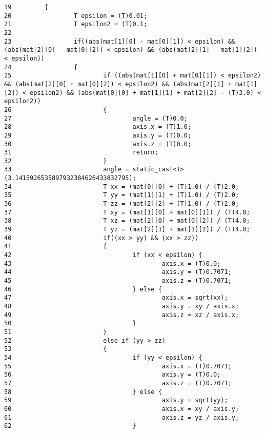 \begin{Code}\begin{verbatim}19         {
20                 T epsilon = (T)0.01;
21                 T epsilon2 = (T)0.1;
22 
23                 if((abs(mat[1][0] - mat[0][1]) < epsilon) && (abs(mat[2][0] - mat[0][2]) < epsilon) && (abs(mat[2][1] - mat[1][2]) < epsilon))
24                 {
25                         if ((abs(mat[1][0] + mat[0][1]) < epsilon2) && (abs(mat[2][0] + mat[0][2]) < epsilon2) && (abs(mat[2][1] + mat[1][2]) < epsilon2) && (abs(mat[0][0] + mat[1][1] + mat[2][2] - (T)3.0) < epsilon2))
26                         {
27                                 angle = (T)0.0;
28                                 axis.x = (T)1.0;
29                                 axis.y = (T)0.0;
30                                 axis.z = (T)0.0;
31                                 return;
32                         }
33                         angle = static_cast<T>(3.1415926535897932384626433832795);
34                         T xx = (mat[0][0] + (T)1.0) / (T)2.0;
35                         T yy = (mat[1][1] + (T)1.0) / (T)2.0;
36                         T zz = (mat[2][2] + (T)1.0) / (T)2.0;
37                         T xy = (mat[1][0] + mat[0][1]) / (T)4.0;
38                         T xz = (mat[2][0] + mat[0][2]) / (T)4.0;
39                         T yz = (mat[2][1] + mat[1][2]) / (T)4.0;
40                         if((xx > yy) && (xx > zz))
41                         {
42                                 if (xx < epsilon) {
43                                         axis.x = (T)0.0;
44                                         axis.y = (T)0.7071;
45                                         axis.z = (T)0.7071;
46                                 } else {
47                                         axis.x = sqrt(xx);
48                                         axis.y = xy / axis.x;
49                                         axis.z = xz / axis.x;
50                                 }
51                         }
52                         else if (yy > zz)
53                         {
54                                 if (yy < epsilon) {
55                                         axis.x = (T)0.7071;
56                                         axis.y = (T)0.0;
57                                         axis.z = (T)0.7071;
58                                 } else {
59                                         axis.y = sqrt(yy);
60                                         axis.x = xy / axis.y;
61                                         axis.z = yz / axis.y;
62                                 }

\end{verbatim}
\end{Code}
